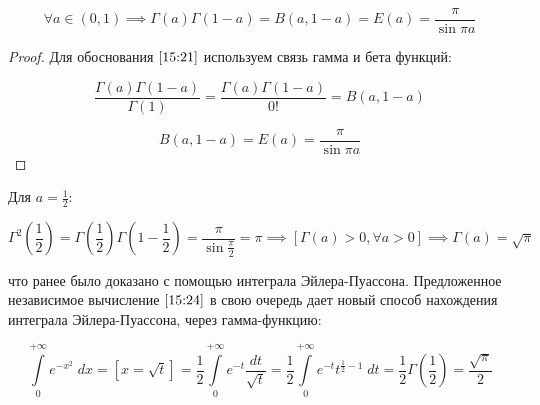 \documentclass[../../main.tex]{subfiles}
\begin{document}
	
\begin{corollary*}
	\begin{equation}
	\label{15:21}
	\forall a \in (0,1) \implies \Gamma(a)\Gamma \left( 1-a\right)  = B\left( 
	a,1-a\right) = E(a) = \frac{\pi}{\sin{\pi a}}
	\end{equation}
\end{corollary*}


\begin{proof}
	Для обоснования $\eqref{15:21}$ используем связь гамма и бета функций:
	
	\begin{equation}
	\label{15:22}
	\frac{\Gamma \left( a\right)\Gamma \left( 1-a\right)}{\Gamma \left( 1\right)} 
	= \frac{\Gamma \left( a\right)\Gamma \left( 1-a\right)}{0!} = B \left( 
	a,1-a\right)
	\end{equation}
	
	
	\begin{equation}
	\label{15:23}
	B \left( a,1-a\right) = E(a) = \frac{\pi}{\sin{\pi a}}
	\end{equation}
\end{proof}	

Для $a = \frac{1}{2}$:

\begin{equation}
\label{15:24}
\Gamma^2 \left( \frac{1}{2} \right) = \Gamma \left( \frac{1}{2} \right) \Gamma 
\left( 1-\frac{1}{2} \right) = \frac{\pi}{\sin{\frac{\pi}{2}}} = \pi \implies 
\left[ \Gamma(a) > 0, \forall a > 0\right] \implies \Gamma(a) = \sqrt{\pi}
\end{equation}

что ранее было доказано с помощью интеграла Эйлера-Пуассона. Предложенное 
независимое вычисление $\eqref{15:24}$ в свою очередь дает новый способ 
нахождения интеграла Эйлера-Пуассона, через гамма-функцию:

\[  \int\limits_{0}^{+\infty} e^{-x^2} \; dx = \left[ x = \sqrt{t} \right] =  
\frac{1}{2} \int\limits_{0}^{+\infty} e^{-t} \frac{dt}{\sqrt{t}} = \frac{1}{2} 
\int\limits_{0}^{+\infty} e^{-t} t^{\frac{1}{2} - 1} \; dt = \frac{1}{2} 
\Gamma\left( \frac{1}{2} \right) = \frac{\sqrt{\pi}}{2}         \]
\end{document}
